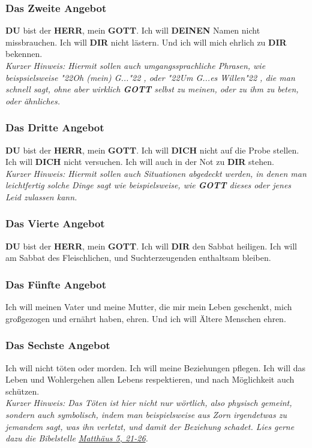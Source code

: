 \documentclass[10pt,a5paper]{article}
\newcommand{\Deinen}[0]{\textbf{DEINEN}}
\newcommand{\Dich}[0]{\textbf{DICH}}
\newcommand{\Dir}[0]{\textbf{DIR}}
\newcommand{\Du}[0]{\textbf{DU}}
\newcommand{\Gott}[0]{\textbf{GOTT}}
\newcommand{\Herr}[0]{\textbf{HERR}}
\newcommand{\q}[1]{\char"22{#1}\char"22 }
\begin{document}
	\subsubsection{Das Zweite Angebot}
		{\Du} bist der {\Herr},
		mein {\Gott}.
		Ich will {\Deinen} Namen nicht missbrauchen.
		Ich will {\Dir} nicht l\"astern.
		Und ich will mich ehrlich zu {\Dir} bekennen.
		\\
		\textit{Kurzer Hinweis:
		Hiermit sollen auch umgangssprachliche Phrasen,
		wie beispsielsweise \q{Oh (mein) G...},
		oder \q{Um G...es Willen},
		die man schnell sagt,
		ohne aber wirklich {\Gott} selbst zu meinen,
		oder zu ihm zu beten,
		oder \"ahnliches.}
			
	\subsubsection{Das Dritte Angebot}
		{\Du} bist der {\Herr},
		mein {\Gott}.
		Ich will {\Dich} nicht auf die Probe stellen.
		Ich will {\Dich} nicht versuchen.
		Ich will auch in der Not zu {\Dir} stehen.
		\\
		\textit{Kurzer Hinweis:
		Hiermit sollen auch Situationen abgedeckt werden,
		in denen man leichtfertig solche Dinge sagt wie beispielsweise,
		wie {\Gott} dieses oder jenes Leid zulassen kann.}
		
	\subsubsection{Das Vierte Angebot}
		{\Du} bist der {\Herr},
		mein {\Gott}.
		Ich will {\Dir} den Sabbat heiligen.
		Ich will am Sabbat des Fleischlichen,
		und Suchterzeugenden enthaltsam bleiben.
		
	\subsubsection{Das F\"unfte Angebot}
		Ich will meinen Vater und meine Mutter,
		die mir mein Leben geschenkt,
		mich gro{\ss}gezogen und ern\"ahrt haben,
		ehren.
		Und ich will \"Altere Menschen ehren.
			
	\subsubsection{Das Sechste Angebot} \label{DasSechsteAngebot}
		Ich will nicht t\"oten oder morden.
		Ich will meine Beziehungen pflegen.
		Ich will das Leben und Wohlergehen allen Lebens respektieren,
		und nach M\"oglichkeit auch sch\"utzen.
		\\
		\textit{Kurzer Hinweis:
		Das T\"oten ist hier nicht nur w\"ortlich,
		also physisch gemeint,
		sondern auch symbolisch,
		indem man beispielsweise aus Zorn irgendetwas zu jemandem sagt,
		was ihn verletzt,
		und damit der Beziehung schadet.
		Lies gerne dazu die Bibelstelle \href{https://www.die-bibel.de/bibeln/online-bibeln/lesen/LU17/MAT.5/Matthäus-5}{Matthäus 5, 21-26}.}
		
\end{document}
